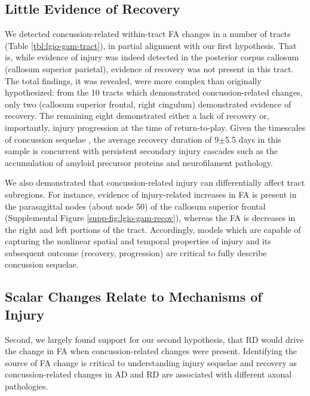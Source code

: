 \documentclass[12pt]{article}
\begin{document}
\subsection{Little Evidence of Recovery}
\label{ssec:disc-evid}
We detected concussion-related within-tract FA changes in a number of tracts (Table \ref{tbl:lgio-gam-tract}), in partial alignment with our first hypothesis. That is, while evidence of injury was indeed detected in the posterior corpus callosum (callosum superior parietal), evidence of recovery was not present in this tract. The total findings, it was revealed, were more complex than originally hypothesized: from the 10 tracts which demonstrated concussion-related changes, only two (callosum superior frontal, right cingulum) demonstrated evidence of recovery. The remaining eight demonstrated either a lack of recovery or, importantly, injury progression at the time of return-to-play. Given the timescales of concussion sequelae \parencite{krieg2023IdentifyingPhenotypesDiffuse}, the average recovery duration of 9$\pm$5.5 days in this sample is concurrent with persistent secondary injury cascades such as the accumulation of amyloid precursor proteins and neurofilament pathology.

We also demonstrated that concussion-related injury can differentially affect tract subregions. For instance, evidence of injury-related increases in FA is present in the parasagittal nodes (about node 50) of the callosum superior frontal (Supplemental Figure \ref{supp-fig:lgio-gam-recov}), whereas the FA is decreases in the right and left portions of the tract. Accordingly, models which are capable of capturing the nonlinear spatial and temporal properties of injury and its subsequent outcome (recovery, progression) are critical to fully describe concussion sequelae.

\subsection{Scalar Changes Relate to Mechanisms of Injury}
\label{ssec:disc-tract}
Second, we largely found support for our second hypothesis, that RD would drive the change in FA when concussion-related changes were present. Identifying the source of FA change is critical to understanding injury sequelae and recovery as concussion-related changes in AD and RD are associated with different axonal pathologies.
\end{document}
